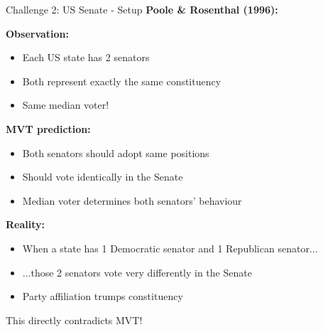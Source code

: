 \documentclass[10pt]{beamer}
\begin{document}
\begin{frame}{Challenge 2: US Senate - Setup}
\textbf{Poole \& Rosenthal (1996):}


\textbf{Observation:}
\begin{itemize}
\item Each US state has 2 senators
\item Both represent \alert{exactly the same constituency}
\item Same median voter!
\end{itemize}



\textbf{MVT prediction:}
\begin{itemize}
\item Both senators should adopt same positions
\item Should vote identically in the Senate
\item Median voter determines both senators' behaviour
\end{itemize}



\textbf{Reality:}
\begin{itemize}
\item When a state has 1 Democratic senator and 1 Republican senator...
\item ...those 2 senators vote \alert{very differently} in the Senate
\item Party affiliation trumps constituency
\end{itemize}



\alert{This directly contradicts MVT!}
\end{frame}
\end{document}
